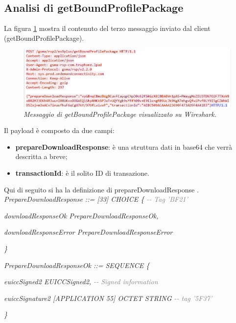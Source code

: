 \documentclass[10pt, oneside]{book}
\begin{document}
\subsection{Analisi di getBoundProfilePackage}
La figura \ref{fig:msg5-stream-pcap} mostra il contenuto del terzo messaggio inviato dal client (getBoundProfilePackage).\\
\begin{figure}
\includegraphics[width=\linewidth]{msg5-stream-pcap.png}
\caption{\textit{Messaggio di getBoundProfilePackage visualizzato su Wireshark.}}
\label{fig:msg5-stream-pcap}
\end{figure}
Il payload è composto da due campi:
\begin{itemize}
\item \textbf{prepareDownloadResponse}: è una struttura dati in base64 che verrà descritta a breve;
\item \textbf{transactionId}: è il solito ID di transazione.
\end{itemize}
Qui di seguito si ha la definizione di prepareDownloadResponse \cite{RSP-definitions}.\\

\textit{PrepareDownloadResponse ::= [33] CHOICE \{ \textcolor{gray}{{-}{-} Tag 'BF21'}}

\hspace{0.75cm} \textit{downloadResponseOk PrepareDownloadResponseOk,}

\hspace{0.75cm} \textit{downloadResponseError PrepareDownloadResponseError}

\textit{\}\\}

\textit{PrepareDownloadResponseOk ::= SEQUENCE \{}

\hspace{0.75cm} \textit{euiccSigned2 EUICCSigned2, \textcolor{gray}{{-}{-} Signed information}}

\hspace{0.75cm} \textit{euiccSignature2 [APPLICATION 55] OCTET STRING \textcolor{gray}{{-}{-} tag '5F37'}}

\textit{\}\\}
\end{document}
